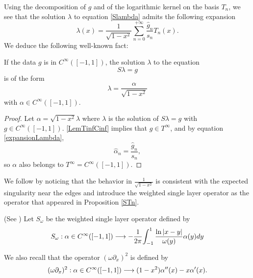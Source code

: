 \documentclass[a4paper]{article}
\begin{document}
Using the decomposition of $g$ and of the logarithmic kernel on the basis $T_n$, we see that the solution $\lambda$ to equation \eqref{Slambda} admits the following expansion 
\begin{equation}
\lambda(x) = \frac{1}{\sqrt{1-x^2}}\sum_{n=0}^{+ \infty} \frac{\hat{g}_n}{s_n} T_n(x).
\label{expansionLambda}
\end{equation}
We deduce the following well-known fact:
\begin{Cor}
	\label{CorSingularity}
	If the data $g$ is in $C^{\infty}([-1,1])$, the solution $\lambda$ to the equation 
	\[S\lambda = g\]
	is of the form 
	\[\lambda = \dfrac{\alpha}{\sqrt{1-x^2}}\]
	with $\alpha \in C^{\infty}([-1,1])$.  
	\begin{proof}
		Let $\alpha = \sqrt{1 - x^2}\lambda$ where $\lambda$ is the solution of $S\lambda = g$ with $g \in C^{\infty}([-1,1])$. 
		\autoref{LemTinfCinf} implies that $g \in T^{\infty}$, and by equation \eqref{expansionLambda}, 
		\[ \hat{\alpha}_n = \frac{\hat{g}_n}{s_n},\]
		so $\alpha$ also  belongs to $T^{\infty} = C^{\infty}([-1,1])$. 
	\end{proof}
\end{Cor}


We follow \cite{bruno2012second} by noticing that the behavior in $\frac{1}{\sqrt{1-x^2}}$ is consistent with the expected singularity near the edges and introduce the weighted single layer operator as the operator that appeared in Proposition \ref{STn}.
\begin{Def}(See \cite{bruno2012second}) 
	Let $S_\omega$ be the weighted single layer operator defined by
	\[S_\omega : \alpha \in C^{\infty}([-1,1]) \longrightarrow -\dfrac{1}{2\pi}{\int_{-1}^1\dfrac{\ln|x-y|}{\omega(y)} \alpha(y)dy}\]
\end{Def}
\noindent We also recall that the operator $(\omega\partial_x)^2$ is defined by \[(\omega\partial_x)^2 : \alpha \in C^{\infty}([-1,1]) \longrightarrow (1-x^2)\alpha''(x) - x \alpha'(x).\]
\end{document}
